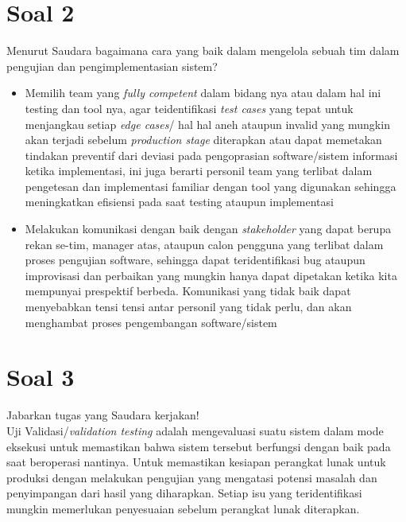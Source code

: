 \documentclass[12pt]{article}
\begin{document}
\section*{Soal 2}
Menurut Saudara bagaimana cara yang baik dalam mengelola sebuah tim dalam pengujian dan pengimplementasian sistem?

\begin{itemize}
    \item  Memilih team yang \emph{fully competent} dalam bidang nya atau dalam hal ini testing dan tool nya, agar teidentifikasi \emph{test cases } yang tepat untuk menjangkau setiap \emph{edge cases}/ hal hal aneh ataupun invalid yang mungkin akan terjadi sebelum \emph{production stage} diterapkan atau dapat memetakan tindakan preventif dari deviasi pada pengoprasian software/sistem informasi ketika implementasi, ini juga berarti personil team yang terlibat dalam pengetesan dan implementasi familiar dengan tool yang digunakan sehingga meningkatkan efisiensi pada saat testing ataupun implementasi
    
    \item Melakukan komunikasi dengan baik dengan \emph{stakeholder} yang dapat berupa rekan se-tim, manager atas, ataupun calon pengguna yang terlibat dalam proses pengujian software, sehingga dapat teridentifikasi bug ataupun improvisasi dan perbaikan yang mungkin hanya dapat dipetakan ketika kita mempunyai prespektif berbeda. Komunikasi yang tidak baik dapat menyebabkan tensi tensi antar personil yang tidak perlu, dan akan menghambat proses pengembangan software/sistem
\end{itemize}


\section*{Soal 3}
Jabarkan tugas yang Saudara kerjakan! \\


Uji Validasi/\emph{validation testing} adalah mengevaluasi suatu sistem dalam mode eksekusi untuk memastikan bahwa sistem tersebut berfungsi dengan  baik pada saat beroperasi nantinya. Untuk memastikan kesiapan perangkat lunak untuk produksi dengan melakukan pengujian yang mengatasi potensi masalah dan penyimpangan dari hasil yang diharapkan. Setiap isu yang teridentifikasi mungkin memerlukan penyesuaian sebelum perangkat lunak diterapkan.
\end{document}
